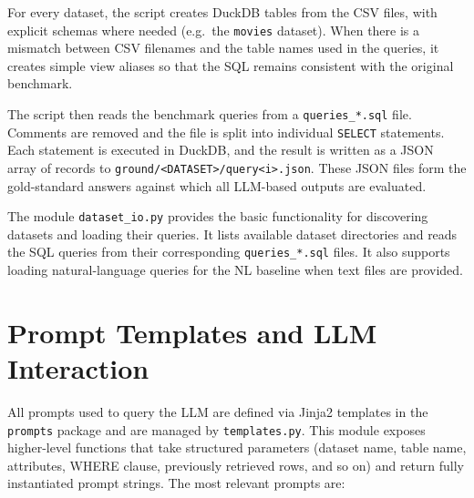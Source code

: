\documentclass[11pt]{article}
\begin{document}
For every dataset, the script creates DuckDB tables from the CSV files, with explicit schemas where needed (e.g.\ the \texttt{movies} dataset). When there is a mismatch between CSV filenames and the table names used in the queries, it creates simple view aliases so that the SQL remains consistent with the original benchmark.

The script then reads the benchmark queries from a \texttt{queries\_*.sql} file. Comments are removed and the file is split into individual \texttt{SELECT} statements. Each statement is executed in DuckDB, and the result is written as a JSON array of records to \texttt{ground/<DATASET>/query<i>.json}. These JSON files form the gold-standard answers against which all LLM-based outputs are evaluated.

The module \texttt{dataset\_io.py} provides the basic functionality for discovering datasets and loading their queries. It lists available dataset directories and reads the SQL queries from their corresponding \texttt{queries\_*.sql} files. It also supports loading natural-language queries for the NL baseline when text files are provided.

\section{Prompt Templates and LLM Interaction}

All prompts used to query the LLM are defined via Jinja2 templates in the \texttt{prompts} package and are managed by \texttt{templates.py}. This module exposes higher-level functions that take structured parameters (dataset name, table name, attributes, WHERE clause, previously retrieved rows, and so on) and return fully instantiated prompt strings. The most relevant prompts are:
\end{document}
